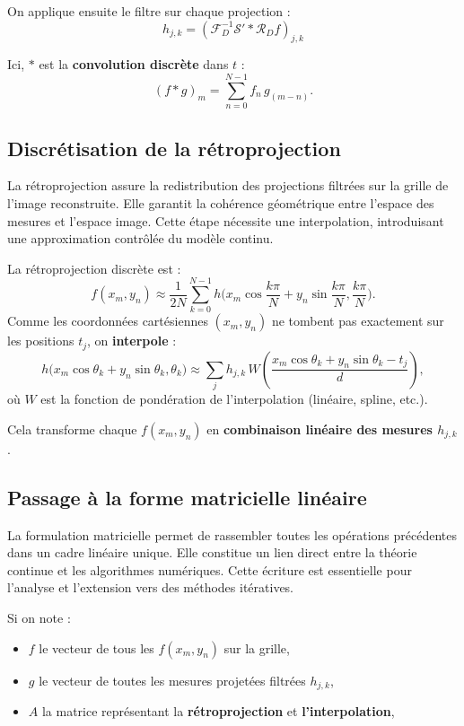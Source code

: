 On applique ensuite le filtre sur chaque projection :
\begin{equation}
h_{j,k} = (\mathcal{F}_D^{-1} \mathcal{S}' \ast \mathcal{R}_D f)_{j,k}
\end{equation}

Ici, $\ast$ est la \textbf{convolution discrète} dans $t$ :
\begin{equation}
(f \ast g)_m = \sum_{n=0}^{N-1} f_n \, g_{(m-n)}.
\end{equation}

\subsection{Discrétisation de la rétroprojection}

La rétroprojection assure la redistribution des projections filtrées sur la grille de l'image reconstruite. Elle garantit la cohérence géométrique entre l'espace des mesures et l'espace image. Cette étape nécessite une interpolation, introduisant une approximation contrôlée du modèle continu.

La rétroprojection discrète est :
\begin{equation}
f(x_m,y_n) \approx \frac{1}{2N} \sum_{k=0}^{N-1} h\Big( x_m \cos \frac{k\pi}{N} + y_n \sin \frac{k\pi}{N}, \frac{k\pi}{N} \Big).
\end{equation}
Comme les coordonnées cartésiennes $(x_m, y_n)$ ne tombent pas exactement sur les positions $t_j$, on \textbf{interpole} :
\begin{equation}
h\big(x_m\cos\theta_k + y_n \sin\theta_k, \theta_k\big) \approx \sum_j h_{j,k} \, W\left(\frac{x_m \cos\theta_k + y_n \sin\theta_k - t_j}{d}\right),
\end{equation}
où $W$ est la fonction de pondération de l'interpolation (linéaire, spline, etc.).

Cela transforme chaque $f(x_m, y_n)$ en \textbf{combinaison linéaire des mesures $h_{j,k}$}.
\subsection{Passage à la forme matricielle linéaire}
La formulation matricielle permet de rassembler toutes les opérations précédentes dans un cadre linéaire unique. Elle constitue un lien direct entre la théorie continue et les algorithmes numériques. Cette écriture est essentielle pour l'analyse et l'extension vers des méthodes itératives.

Si on note :
\begin{itemize}
    \item $f$ le vecteur de tous les $f(x_m, y_n)$ sur la grille,
    \item $g$ le vecteur de toutes les mesures projetées filtrées $h_{j,k}$,
    \item $A$ la matrice représentant la \textbf{rétroprojection} et \textbf{l'interpolation},
\end{itemize}


